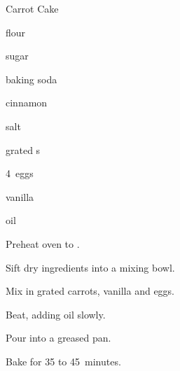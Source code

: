 \begin{recipe}{Carrot Cake}{}{}

\begin{ingredients}
\item {} flour
\item {} sugar
\item {} baking soda
\item {} cinnamon
\item {} salt
\item {} grated s
\item 4~eggs
\item {} vanilla
\item \C{\half} oil
\end{ingredients}

\begin{directions}
\item Preheat oven to .
\item Sift dry ingredients into a mixing bowl.
\item Mix in grated carrots, vanilla and eggs.
\item Beat, adding oil slowly.
\item Pour into a greased pan.
\item Bake for 35 to 45~minutes.
\end{directions}
\end{recipe}
